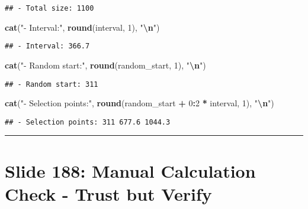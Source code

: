 \documentclass[
]{article}
\newenvironment{Shaded}{\begin{snugshade}}{\end{snugshade}}
\newcommand{\DecValTok}[1]{\textcolor[rgb]{0.00,0.00,0.81}{#1}}
\newcommand{\FunctionTok}[1]{\textcolor[rgb]{0.13,0.29,0.53}{\textbf{#1}}}
\newcommand{\NormalTok}[1]{#1}
\newcommand{\SpecialCharTok}[1]{\textcolor[rgb]{0.81,0.36,0.00}{\textbf{#1}}}
\newcommand{\StringTok}[1]{\textcolor[rgb]{0.31,0.60,0.02}{#1}}
\begin{document}
\begin{verbatim}
## - Total size: 1100
\end{verbatim}

\begin{Shaded}
\begin{Highlighting}[]
\FunctionTok{cat}\NormalTok{(}\StringTok{"{-} Interval:"}\NormalTok{, }\FunctionTok{round}\NormalTok{(interval, }\DecValTok{1}\NormalTok{), }\StringTok{"}\SpecialCharTok{\textbackslash{}n}\StringTok{"}\NormalTok{)}
\end{Highlighting}
\end{Shaded}

\begin{verbatim}
## - Interval: 366.7
\end{verbatim}

\begin{Shaded}
\begin{Highlighting}[]
\FunctionTok{cat}\NormalTok{(}\StringTok{"{-} Random start:"}\NormalTok{, }\FunctionTok{round}\NormalTok{(random\_start, }\DecValTok{1}\NormalTok{), }\StringTok{"}\SpecialCharTok{\textbackslash{}n}\StringTok{"}\NormalTok{)}
\end{Highlighting}
\end{Shaded}

\begin{verbatim}
## - Random start: 311
\end{verbatim}

\begin{Shaded}
\begin{Highlighting}[]
\FunctionTok{cat}\NormalTok{(}\StringTok{"{-} Selection points:"}\NormalTok{, }
    \FunctionTok{round}\NormalTok{(random\_start }\SpecialCharTok{+} \DecValTok{0}\SpecialCharTok{:}\DecValTok{2} \SpecialCharTok{*}\NormalTok{ interval, }\DecValTok{1}\NormalTok{), }\StringTok{"}\SpecialCharTok{\textbackslash{}n}\StringTok{"}\NormalTok{)}
\end{Highlighting}
\end{Shaded}

\begin{verbatim}
## - Selection points: 311 677.6 1044.3
\end{verbatim}

\begin{center}\rule{0.5\linewidth}{0.5pt}\end{center}

\section{Slide 188: Manual Calculation Check - Trust but
Verify}\label{slide-188-manual-calculation-check---trust-but-verify}
\end{document}
